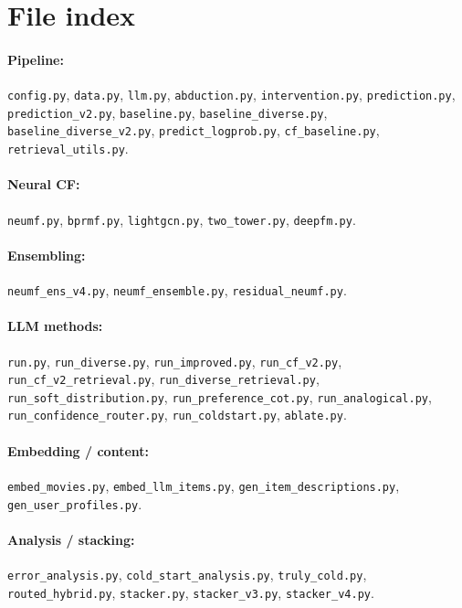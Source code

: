 \documentclass[11pt,a4paper]{article}
\begin{document}
\section{File index}
\paragraph{Pipeline:} \texttt{config.py}, \texttt{data.py},
\texttt{llm.py}, \texttt{abduction.py}, \texttt{intervention.py},
\texttt{prediction.py}, \texttt{prediction\_v2.py}, \texttt{baseline.py},
\texttt{baseline\_diverse.py}, \texttt{baseline\_diverse\_v2.py},
\texttt{predict\_logprob.py}, \texttt{cf\_baseline.py},
\texttt{retrieval\_utils.py}.

\paragraph{Neural CF:} \texttt{neumf.py}, \texttt{bprmf.py},
\texttt{lightgcn.py}, \texttt{two\_tower.py}, \texttt{deepfm.py}.

\paragraph{Ensembling:} \texttt{neumf\_ens\_v4.py},
\texttt{neumf\_ensemble.py}, \texttt{residual\_neumf.py}.

\paragraph{LLM methods:} \texttt{run.py}, \texttt{run\_diverse.py},
\texttt{run\_improved.py}, \texttt{run\_cf\_v2.py},
\texttt{run\_cf\_v2\_retrieval.py},
\texttt{run\_diverse\_retrieval.py},
\texttt{run\_soft\_distribution.py}, \texttt{run\_preference\_cot.py},
\texttt{run\_analogical.py}, \texttt{run\_confidence\_router.py},
\texttt{run\_coldstart.py}, \texttt{ablate.py}.

\paragraph{Embedding / content:} \texttt{embed\_movies.py},
\texttt{embed\_llm\_items.py}, \texttt{gen\_item\_descriptions.py},
\texttt{gen\_user\_profiles.py}.

\paragraph{Analysis / stacking:} \texttt{error\_analysis.py},
\texttt{cold\_start\_analysis.py}, \texttt{truly\_cold.py},
\texttt{routed\_hybrid.py}, \texttt{stacker.py}, \texttt{stacker\_v3.py},
\texttt{stacker\_v4.py}.
\end{document}
